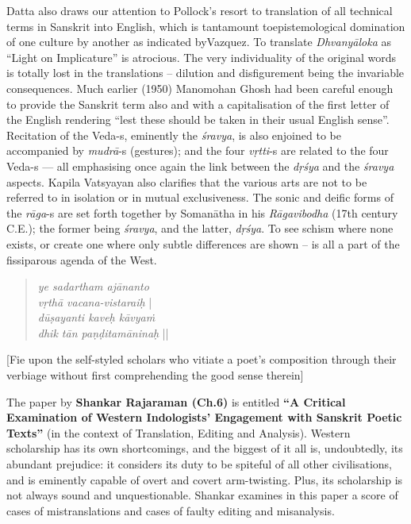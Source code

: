 Datta also draws our attention to Pollock’s resort to translation of all technical terms in Sanskrit into English, which is tantamount to\break epistemological domination of one culture by another as indicated by\break Vazquez. To translate \textsl{Dhvanyāloka} as “Light on Implicature” is atrocious. The very individuality of the original words is totally lost in the translations -- dilution and disfigurement being the invariable consequences. Much earlier (1950) Manomohan Ghosh had been careful enough to provide the Sanskrit term also and with a capitalisation of the first letter of the English rendering “lest these should be taken in their usual English sense”. Recitation of the \hbox{Veda-s}, eminently the \textsl{śravya}, is also enjoined to be accompanied by \hbox{\textsl{mudrā}-s} (gestures); and the four \textsl{vṛtti}-s are related to the four Veda-s --- all emphasising once again the link between the \textsl{dṛśya} and the \textsl{śravya} aspects. Kapila Vatsyayan also clarifies that the various arts are not to be referred to in isolation or in mutual exclusiveness. The sonic and deific forms of the \textsl{rāga}-s are set forth together by Somanātha in his \textsl{Rāgavibodha} (17th century C.E.); the former being \textsl{śravya}, and the latter, \textsl{dṛśya}. To see schism where none exists, or create one where only subtle differences are shown -- is all a part of the fissiparous agenda of the West.\\[-18pt]
\begin{quote}
\textsl{ye sadartham ajānanto}\\
\textsl{vṛthā vacana-vistaraiḥ} |\\
\textsl{dūṣayanti kaveḥ kāvyaṁ}\\
\textsl{dhik tān paṇḍitamāninaḥ} ||
\end{quote}
[Fie upon the self-styled scholars who vitiate a poet's composition through their verbiage without first comprehending the good sense therein]

The paper by {\bf Shankar Rajaraman (Ch.\@ 6)} is entitled {\bf “A Critical Examination of Western Indologists’ Engagement with Sanskrit Poetic Texts”} (in the context of Translation, Editing and Analysis). Western scholarship has its own shortcomings, and the biggest of it all is, undoubtedly, its abundant prejudice: it considers its duty to be spiteful of all other civilisations, and is eminently capable of overt and covert arm-twisting. Plus, its scholarship is not always sound and unquestionable. Shankar examines in this paper a score of cases of mistranslations and cases of faulty editing and misanalysis. 

